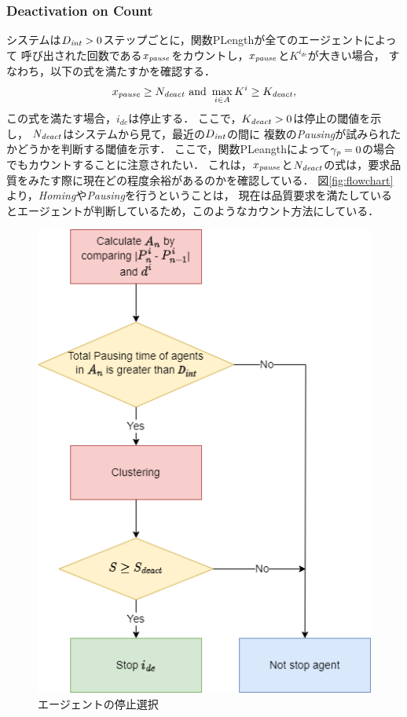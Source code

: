 \documentclass[12pt,a4j,twoside]{jarticle}
\def\AgentSet{A}
\def\PauseTimeFactor{{\gamma_{\it p}}}
\def\DeactCheckInterval{D_{\it int}}
\def\PauseCount{x_{\it pause}}
\def\DeactCount{N_{\it deact}}
\def\DeactThreshold{K_{\it deact}}
\begin{document}
  \subsubsection{Deactivation on Count}\label{sec:CountStop}
  システムは$\DeactCheckInterval>0$ステップごとに，関数\textsf{PLength}が全てのエージェントによって
  呼び出された回数である$\PauseCount$をカウントし，$\PauseCount$と$K^{i_{de}}$が大きい場合，
  すなわち，以下の式を満たすかを確認する．
  \begin{equation}
    \PauseCount \geq \DeactCount \textrm{ and } \max_{i\in\AgentSet}
    K^i \geq \DeactThreshold,
  \end{equation}
  この式を満たす場合，$i_{de}$は停止する．
  ここで，$\DeactThreshold > 0$は停止の閾値を示し，
  $\DeactCount$はシステムから見て，最近の$\DeactCheckInterval$の間に
  複数の{\em Pausing}が試みられたかどうかを判断する閾値を示す．
  ここで，関数\textsf{PLeangth}によって$\PauseTimeFactor=0$の場合でもカウントすることに注意されたい．
  これは，$\PauseCount$と$\DeactCount$の式は，要求品質をみたす際に現在どの程度余裕があるのかを確認している．
  図\ref{fig:flowchart}より，{\em Homing}や{\em Pausing}を行うということは，
  現在は品質要求を満たしているとエージェントが判断しているため，このようなカウント方法にしている．
  

  \begin{figure}
    \centering
    \includegraphics[width=0.6\hsize]{figures/Flowchart_stop_E.png}
    \caption{エージェントの停止選択}
    \label{fig:flowchart_stop}
  \end{figure}
\end{document}
